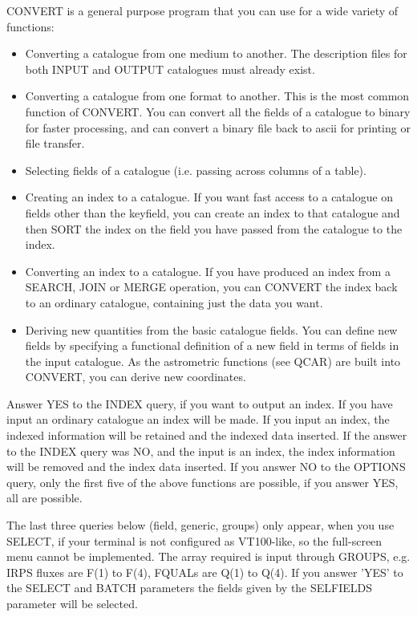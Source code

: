 CONVERT is a general purpose program that you can use for
a wide variety of functions:
\begin{itemize}
\item Converting a catalogue from one medium to another.
The description files for both INPUT and OUTPUT catalogues must already exist.
\item Converting a catalogue from one format to another.
This is the most common function of CONVERT.
You can convert all the fields of a catalogue to binary for faster processing,
and can convert a binary file back to ascii for printing or file transfer.
\item Selecting fields of a catalogue (i.e. passing across columns of a table).
\item Creating an index to a catalogue.
If you want fast access to a catalogue on fields other than the keyfield, you
can create an index to that catalogue and then SORT the index on the field you
have passed from the catalogue to the index.
\item Converting an index to a catalogue.
If you have produced an index from a SEARCH, JOIN or MERGE operation, you can
CONVERT the index back to an ordinary catalogue, containing just the data you
want.
\item Deriving new quantities from the basic catalogue fields.
You can define new fields by specifying a functional definition of a new field
in terms of fields in the input catalogue.
As the astrometric functions (see QCAR) are built into CONVERT, you can derive
new coordinates.
\end{itemize}
Answer YES to the INDEX query, if you want to output an index. 
If you have input an ordinary catalogue an index will be made.
If you input an index, the indexed information will be retained and the indexed
data inserted. If the answer to the INDEX query was NO, and the input is an
index, the index information will be removed and the index data inserted.
If you answer NO to the OPTIONS query, only the first five of the above
functions are possible, if you answer YES, all are possible.

The last three queries below (field, generic, groups) only appear, when you use
SELECT, if your terminal is not configured as VT100-like, so the full-screen 
menu cannot be implemented.
The array required is input through GROUPS, e.g. IRPS fluxes are F(1) to 
F(4), FQUALs are Q(1) to Q(4).
If you answer 'YES' to the SELECT and BATCH parameters the fields given by the
SELFIELDS parameter will be selected.

